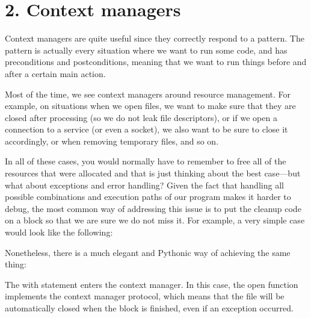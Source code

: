 \documentclass[a4paper,10pt,english]{sphinxmanual}
\begin{document}
\section{2. Context managers}
\label{\detokenize{chapters/2_pythonic_code/index:context-managers}}
Context managers are quite useful since they correctly respond to a pattern. The pattern is actually every situation
where we want to run some code, and has preconditions and postconditions, meaning that we want to run things before and
after a certain main action.

Most of the time, we see context managers around resource management. For example, on situations when we open files, we
want to make sure that they are closed after processing (so we do not leak file descriptors), or if we open a connection
to a service (or even a socket), we also want to be sure to close it accordingly, or when removing temporary files, and
so on.

In all of these cases, you would normally have to remember to free all of the resources that were allocated and that is
just thinking about the best case—but what about exceptions and error handling? Given the fact that handling all
possible combinations and execution paths of our program makes it harder to debug, the most common way of addressing
this issue is to put the cleanup code on a  block so that we are sure we do not miss it. For example, a very
simple case would look like the following:

\begin{sphinxVerbatim}[commandchars=\\\{\}]
  
\end{sphinxVerbatim}

Nonetheless, there is a much elegant and Pythonic way of achieving the same thing:

\begin{sphinxVerbatim}[commandchars=\\\{\}]
   
\end{sphinxVerbatim}

The with statement enters the context manager. In this case, the open function implements the context manager protocol,
which means that the file will be automatically closed when the block is finished, even if an exception occurred.
\end{document}
